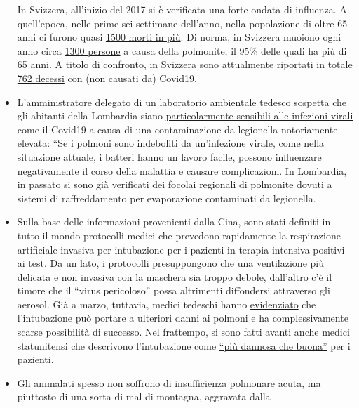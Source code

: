 \begin{itemize}
  In Svizzera, all'inizio del 2017 si è verificata una forte ondata di
  influenza. A quell'epoca, nelle prime sei settimane dell'anno, nella
  popolazione di oltre 65 anni ci furono quasi
  \href{https://www.srf.ch/news/schweiz/todesursachen-statistik-woran-die-meisten-schweizerinnen-und-schweizer-sterben}{1500
  morti in più}. Di norma, in Svizzera muoiono ogni anno circa
  \href{https://www.nzz.ch/lungenentzuendung-1.4550285}{1300 persone} a
  causa della polmonite, il 95\% delle quali ha più di 65 anni. A titolo
  di confronto, in Svizzera sono attualmente riportati in totale
  \href{https://www.corona-data.ch/}{762 decessi} con (non causati da)
  Covid19.
\item
  L'amministratore delegato di un laboratorio ambientale tedesco
  sospetta che gli abitanti della Lombardia siano
  \href{https://m.apotheke-adhoc.de/nachrichten/detail/coronavirus/erhoehen-legionellen-die-todesrate-einer-corona-infektion/}{particolarmente
  sensibili alle infezioni virali} come il Covid19 a causa di una
  contaminazione da legionella notoriamente elevata: ``Se i polmoni sono
  indeboliti da un'infezione virale, come nella situazione attuale, i
  batteri hanno un lavoro facile, possono influenzare negativamente il
  corso della malattia e causare complicazioni. In Lombardia, in passato
  si sono già verificati dei focolai regionali di polmonite dovuti a
  sistemi di raffreddamento per evaporazione contaminati da legionella.
\item
  Sulla base delle informazioni provenienti dalla Cina, sono stati
  definiti in tutto il mondo protocolli medici che prevedono rapidamente
  la respirazione artificiale invasiva per intubazione per i pazienti in
  terapia intensiva positivi ai test. Da un lato, i protocolli
  presuppongono che una ventilazione più delicata e non invasiva con la
  maschera sia troppo debole, dall'altro c'è il timore che il ``virus
  pericoloso'' possa altrimenti diffondersi attraverso gli aerosol. Già
  a marzo, tuttavia, medici tedeschi hanno
  \href{https://www.doccheck.com/de/detail/articles/26271-covid-19-beatmung-und-dann}{evidenziato}
  che l'intubazione può portare a ulteriori danni ai polmoni e ha
  complessivamente scarse possibilità di successo. Nel frattempo, si
  sono fatti avanti anche medici statunitensi che descrivono
  l'intubazione come
  \href{https://www.youtube.com/watch?v=k9GYTc53r2o}{``più dannosa che
  buona''} per i pazienti.
\item
  Gli ammalati spesso non soffrono di insufficienza polmonare acuta, ma
  piuttosto di una sorta di mal di montagna, aggravata dalla

\end{itemize}
